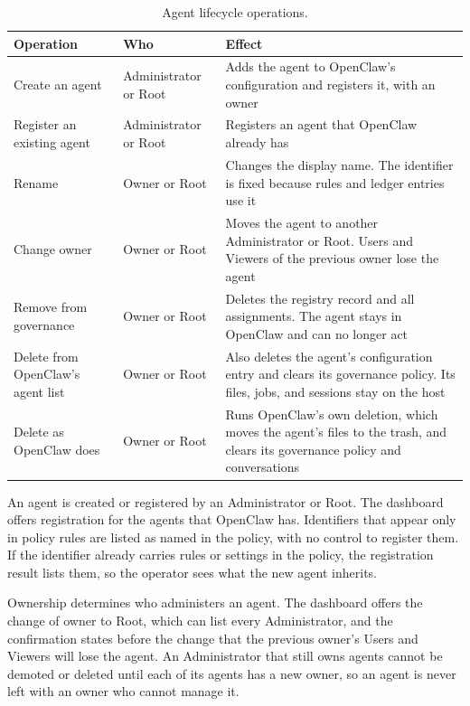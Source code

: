 \begin{table}[htbp]
\centering
\caption{Agent lifecycle operations.}
\label{tab:gov-agent-lifecycle}
\small
\begin{tabularx}{\textwidth}{@{}>{\raggedright\arraybackslash}p{}>{\raggedright\arraybackslash}p{}>{\raggedright\arraybackslash}X@{}}
\toprule
\textbf{Operation} & \textbf{Who} & \textbf{Effect} \\
\midrule
Create an agent & Administrator or Root & Adds the agent to OpenClaw's
configuration and registers it, with an owner \\
Register an existing agent & Administrator or Root & Registers an agent
that OpenClaw already has \\
Rename & Owner or Root & Changes the display name. The identifier is
fixed because rules and ledger entries use it \\
Change owner & Owner or Root & Moves the agent to another Administrator or Root.
Users and Viewers of the previous owner lose the agent \\
Remove from governance & Owner or Root & Deletes the registry record and
all assignments. The agent stays in OpenClaw and can no longer act \\
Delete from OpenClaw's agent list & Owner or Root & Also deletes the
agent's configuration entry and clears its governance policy. Its files,
jobs, and sessions stay on the host \\
Delete as OpenClaw does & Owner or Root & Runs OpenClaw's own deletion,
which moves the agent's files to the trash, and clears its governance
policy and conversations \\
\bottomrule
\end{tabularx}
\end{table}

An agent is created or registered by an Administrator or Root. The
dashboard offers registration for the agents that OpenClaw has.
Identifiers that appear only in policy rules are listed as named in the
policy, with no control to register them. If the identifier already carries rules or
settings in the policy, the registration result lists them, so the
operator sees what the new agent inherits.

Ownership determines who administers an agent. The dashboard offers the
change of owner to Root, which can list every Administrator, and the
confirmation states before the change that the previous owner's Users and
Viewers will lose the agent. An Administrator that
still owns agents cannot be demoted or deleted until each of its agents has
a new owner, so an agent is never left with an owner who cannot manage it.

